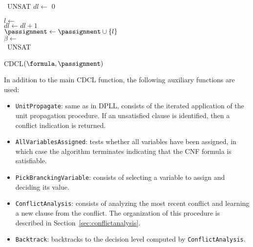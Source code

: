 \begin{algorithm}[!ht]
    {\Return~UNSAT}
    $dl \leftarrow$ 0

    \While{$\neg$\alvarass{$\formula$, $\passignment$}}
    {%
        $l \leftarrow$ \pickvar{$\formula$, $\passignment$}\\
        $dl \leftarrow dl + 1$\\
        $\passignment \leftarrow \passignment \cup \{l\}$\\
        {%
            $\beta \leftarrow$ \\
            {\Return~UNSAT}
        }
    }
    \caption{CDCL$(\formula, \passignment)$}%
\label{alg:cdcl}
\end{algorithm}

In addition to the main CDCL function, the following auxiliary functions are
used:
\begin{itemize}
    \item \texttt{UnitPropagate}:
        same as in DPLL, consists of the iterated application of the unit
        propagation procedure. If an unsatisfied clause is identified, then a
        conflict indication is returned.
    \item \texttt{AllVariablesAssigned}:
        tests whether all variables have been assigned, in which case the
        algorithm terminates indicating that the CNF formula is satisfiable. 
    \item \texttt{PickBranckingVariable}:
        consists of selecting a variable to assign and deciding its value.
    \item \texttt{ConflictAnalysis}:
        consists of analyzing the most recent conflict and learning a new clause
        from the conflict. The organization of this procedure is described in
        Section~\ref{sec:conflictanalysis}.
    \item \texttt{Backtrack}:
        backtracks to the decision level computed by \texttt{ConflictAnalysis}.
\end{itemize}

